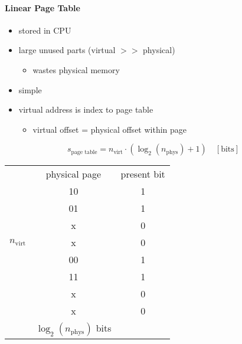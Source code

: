 \paragraph{Linear Page Table}
\begin{itemize}
    \item stored in CPU
    \item large unused parts (virtual $>>$ physical)
    \begin{itemize}
        \item wastes physical memory
    \end{itemize}
    \item simple
    \item virtual address is index to page table
    \begin{itemize}
        \item virtual offset = physical offset within page
    \end{itemize}
\end{itemize}

\noindent\begin{equation*}
    s_{\text{page table}} = n_{\text{virt}}\cdot (\log_2(n_{\text{phys}}) + 1)\quad [\text{bits}]
\end{equation*}

\renewcommand{\arraystretch}{1.3}
\setlength{\oldtabcolsep}{\tabcolsep}\setlength\tabcolsep{6pt}
\begin{tabularx}{\linewidth}{@{} c c c@{}}
                                                                                   & physical page                  & present bit \\
    \cmidrule{2-3}
    \multirow{7}{*}{\begin{sideways}$n_{\text{virt}}$\end{sideways}} & 10                             & 1           \\
                                                                                   & 01                             & 1           \\
                                                                                   & x                              & 0           \\
                                                                                   & x                              & 0           \\
                                                                                   & 00                             & 1           \\
                                                                                   & 11                             & 1           \\
                                                                                   & x                              & 0           \\
                                                                                   & x                              & 0           \\
    \cmidrule{2-3}
                                                                                   & $\log_2(n_{\text{phys}})$ bits &
\end{tabularx}

